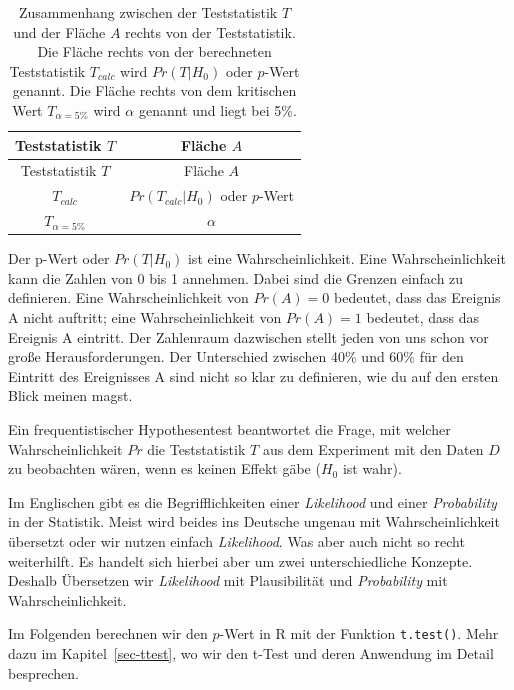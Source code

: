 \documentclass[
  letterpaper,
]{scrbook}
\begin{document}
\hypertarget{tbl-t-und-A}{}
\begin{longtable}[]{@{}cc@{}}
\caption{\label{tbl-t-und-A}Zusammenhang zwischen der Teststatistik
\(T\) und der Fläche \(A\) rechts von der Teststatistik. Die Fläche
rechts von der berechneten Teststatistik \(T_{calc}\) wird \(Pr(T|H_0)\)
oder \(p\)-Wert genannt. Die Fläche rechts von dem kritischen Wert
\(T_{\alpha = 5\%}\) wird \(\alpha\) genannt und liegt bei
5\%.}\tabularnewline
\toprule()
Teststatistik \(T\) & Fläche \(A\) \\
\midrule()
\endfirsthead
\toprule()
Teststatistik \(T\) & Fläche \(A\) \\
\midrule()
\endhead
\(T_{calc}\) & \(Pr(T_{calc}|H_0)\) oder \(p\)-Wert \\
\(T_{\alpha = 5\%}\) & \(\alpha\) \\
\bottomrule()
\end{longtable}

Der p-Wert oder \(Pr(T|H_0)\) ist eine Wahrscheinlichkeit. Eine
Wahrscheinlichkeit kann die Zahlen von 0 bis 1 annehmen. Dabei sind die
Grenzen einfach zu definieren. Eine Wahrscheinlichkeit von \(Pr(A) = 0\)
bedeutet, dass das Ereignis A nicht auftritt; eine Wahrscheinlichkeit
von \(Pr(A) = 1\) bedeutet, dass das Ereignis A eintritt. Der Zahlenraum
dazwischen stellt jeden von uns schon vor große Herausforderungen. Der
Unterschied zwischen 40\% und 60\% für den Eintritt des Ereignisses A
sind nicht so klar zu definieren, wie du auf den ersten Blick meinen
magst.

Ein frequentistischer Hypothesentest beantwortet die Frage, mit welcher
Wahrscheinlichkeit \(Pr\) die Teststatistik \(T\) aus dem Experiment mit
den Daten \(D\) zu beobachten wären, wenn es keinen Effekt gäbe (\(H_0\)
ist wahr).

{}

Im Englischen gibt es die Begrifflichkeiten einer \emph{Likelihood} und
einer \emph{Probability} in der Statistik. Meist wird beides ins
Deutsche ungenau mit Wahrscheinlichkeit übersetzt oder wir nutzen
einfach \emph{Likelihood}. Was aber auch nicht so recht weiterhilft. Es
handelt sich hierbei aber um zwei unterschiedliche Konzepte. Deshalb
Übersetzen wir \emph{Likelihood} mit Plausibilität und
\emph{Probability} mit Wahrscheinlichkeit.

Im Folgenden berechnen wir den \(p\)-Wert in R mit der Funktion
\texttt{t.test()}. Mehr dazu im Kapitel~\ref{sec-ttest}, wo wir den
t-Test und deren Anwendung im Detail besprechen.
\end{document}

